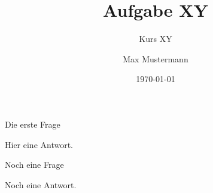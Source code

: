 \documentclass[11pt]{scrartcl}
\title{Aufgabe XY}
\subtitle{Kurs XY}
\date{\today}
\author{Max Mustermann}
\begin{document}
\begin{question}
Die erste Frage
\end{question}

Hier eine Antwort.


\begin{question}
Noch eine Frage
\end{question}

Noch eine Antwort.

\end{document}
